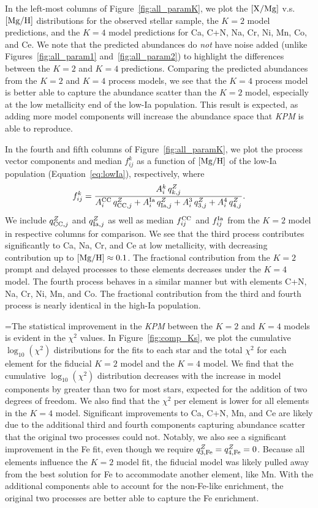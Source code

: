 \documentclass[modern]{aastex631}
\newcommand{\xmg}{[{\rm X}/{\rm Mg}]}
\newcommand{\mgh}{[{\rm Mg}/{\rm H}]}
\newcommand{\qcc}{q_{{\rm CC,}j}^{Z}}
\newcommand{\qIa}{q_{{\rm Ia,}j}^{Z}}
\newcommand{\Acc}{A^{\rm CC}_{i}}
\newcommand{\AIa}{A^{\rm Ia}_{i}}
\newcommand{\fcc}{f_{ij}^{\rm CC}}
\newcommand{\name}{\textsl{KPM}}
\begin{document}
In the left-most columns of Figure~\ref{fig:all_paramK}, we plot the $\xmg$ v.s. $\mgh$ distributions for the observed stellar sample, the $K=2$ model predictions, and the $K=4$ model predictions for Ca, C+N, Na, Cr, Ni, Mn, Co, and Ce. We note that the predicted abundances do \textit{not} have noise added (unlike Figures~\ref{fig:all_param1} and~\ref{fig:all_param2}) to highlight the differences between the $K=2$ and $K=4$ predictions. Comparing the predicted abundances from the $K=2$ and $K=4$ process models, we see that the $K=4$ process model is better able to capture the abundance scatter than the $K=2$ model, especially at the low metallicity end of the low-Ia population. This result is expected, as adding more model components will increase the abundance space that \name{} is able to reproduce.

In the fourth and fifth columns of Figure~\ref{fig:all_paramK}, we plot the process vector components and median $f^{k}_{ij}$ as a function of $\mgh$ of the low-Ia population (Equation~\ref{eq:lowIa}), respectively, where
\begin{equation}\label{eq:fX}
    f^{k}_{ij} = \frac{A_{i}^{k} \, q_{k,j}^Z}{\Acc\,\qcc + \AIa\,\qIa + A_{i}^{3}\,q_{3, j}^{Z} + A_{i}^{4}\,q_{4, j}^{Z}}.
\end{equation}
We include $\qcc$ and $\qIa$ as well as median $\fcc$ and $f^{\rm Ia}_{ij}$ from the $K=2$ model in respective columns for comparison. We see that the third process contributes significantly to Ca, Na, Cr, and Ce at low metallicity, with decreasing contribution up to $\mgh\approx0.1$. The fractional contribution from the $K=2$ prompt and delayed processes to these elements decreases under the $K=4$ model. The fourth process behaves in a similar manner but with elements C+N, Na, Cr, Ni, Mn, and Co. The fractional contribution from the third and fourth process is nearly identical in the high-Ia population.

=The statistical improvement in the \name{} between the $K=2$ and $K=4$ models is evident in the $\chi^2$ values.
In Figure~\ref{fig:comp_Ks}, we plot the cumulative $\log_{10}(\chi^2)$ distributions for the fits to each star and the total $\chi^2$ for each element for the fiducial $K=2$ model and the $K=4$ model. 
We find that the cumulative $\log_{10}(\chi^2)$ distribution decreases with the increase in model components by greater than two for most stars, expected for the addition of two degrees of freedom. 
We also find that the $\chi^2$ per element is lower for all elements in the $K=4$ model. 
Significant improvements to Ca, C+N, Mn, and Ce are likely due to the additional third and fourth components capturing abundance scatter that the original two processes could not. 
Notably, we also see a significant improvement in the Fe fit, even though we require $q_{\rm 3,Fe}^{Z} = q_{\rm 4,Fe}^{Z} = 0$. Because all elements influence the $K=2$ model fit, the fiducial model was likely pulled away from the best solution for Fe to accommodate another element, like Mn. 
With the additional components able to account for the non-Fe-like enrichment, the original two processes are better able to capture the Fe enrichment.
\end{document}

